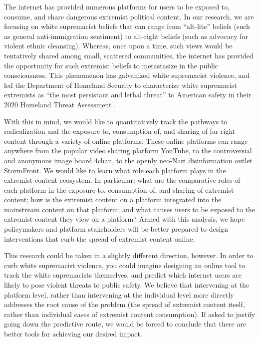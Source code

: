 \documentclass[12pt]{article}
\begin{document}
		The internet has provided numerous platforms for users to be exposed to, consume, and share dangerous extremist political content. In our research, we are focusing on white supremacist beliefs that can range from ``alt-lite'' beliefs (such as general anti-immigration sentiment) to alt-right beliefs (such as advocacy for violent ethnic cleansing). Whereas, once upon a time, such views would be tentatively shared among small, scattered communities, the internet has provided the opportunity for such extremist beliefs to metastasize in the public consciousness. This phenomenon has galvanized white supremacist violence, and led the Department of Homeland Security to characterize white supremacist extremists as “the most persistant and lethal threat” to American safety in their 2020 Homeland Threat Assessment \cite{dhs}. 

		With this in mind, we would like to quantitatively track the pathways to radicalization and the exposure to, consumption of, and sharing of far-right content through a variety of online platforms. These online platforms can range anywhere from the popular video sharing platform YouTube, to the controversial and anonymous image board 4chan, to the openly neo-Nazi disinformation outlet StormFront. We would like to learn what role each platform plays in the extremist content ecosystem. In particular: what are the comparative roles of each platform in the exposure to, consumption of, and sharing of extremist content; how is the extremist content on a platform integrated into the mainstream content on that platform; and what causes users to be exposed to the extremist content they view on a platform? Armed with this analysis, we hope policymakers and platform stakeholders will be better prepared to design interventions that curb the spread of extremist content online. 

		This research could be taken in a slightly different direction, however. In order to curb white supremacist violence, you could imagine designing an online tool to track the white supremacists themselves, and predict which internet users are likely to pose violent threats to public safety. We believe that intervening at the platform level, rather than intervening at the individual level more directly addresses the root cause of the problem (the spread of extremist content itself, rather than individual cases of extremist content consumption). If asked to justify going down the predictive route, we would be forced to conclude that there are better tools for achieving our desired impact.
\end{document}
